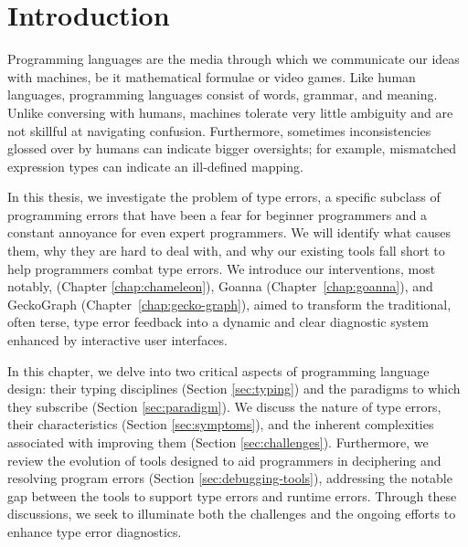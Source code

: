 
\chapter{Introduction}

\label{chap:introduction} 

\graphicspath{{Figures/Introduction}}

Programming languages are the media through which we communicate our ideas with machines, be it mathematical formulae or video games. Like human languages, programming languages consist of words, grammar, and meaning. Unlike conversing with humans, machines tolerate very little ambiguity and are not skillful at navigating confusion. Furthermore, sometimes inconsistencies glossed over by humans can indicate bigger oversights; for example, mismatched expression types can indicate an ill-defined mapping. 

In this thesis, we investigate the problem of type errors, a specific subclass of programming errors that have been a fear for beginner programmers and a constant annoyance for even expert programmers. We will identify what causes them, why they are hard to deal with, and why our existing tools fall short to help programmers combat type errors. We introduce our interventions, most notably, \chameleon{} (Chapter \ref{chap:chameleon}), Goanna (Chapter~\ref{chap:goanna}), and GeckoGraph (Chapter~\ref{chap:gecko-graph}), aimed to transform the traditional, often terse, type error feedback into a dynamic and clear diagnostic system enhanced by interactive user interfaces. 


In this chapter, we delve into two critical aspects of programming language design: their typing disciplines (Section \ref{sec:typing}) and the paradigms to which they subscribe (Section \ref{sec:paradigm}). We discuss the nature of type errors, their characteristics (Section \ref{sec:symptoms}), and the inherent complexities associated with improving them (Section \ref{sec:challenges}). Furthermore, we review the evolution of tools designed to aid programmers in deciphering and resolving program errors (Section \ref{sec:debugging-tools}), addressing the notable gap between the tools to support type errors and runtime errors. Through these discussions, we seek to illuminate both the challenges and the ongoing efforts to enhance type error diagnostics.






